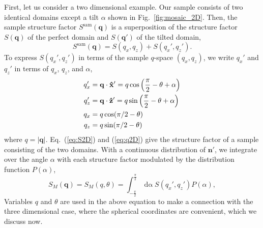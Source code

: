 First, let us consider a two dimensional example. 
Our sample consists of two identical domains except a tilt $\alpha$
shown in Fig.~\ref{fig:mosaic_2D}.
Then, the sample structure factor $S^\textrm{sam}(\mathbf{q})$ is 
a superposition of the structure factor $S(\mathbf{q})$ of the perfect
domain and $S(\mathbf{q'})$ of the tilted domain,
\begin{equation}
  S^\textrm{sam}(\mathbf{q}) = S(q_x,q_z) + S(q_x',q_z').
  \label{eq:S2D}
\end{equation}
To express $S(q_x',q_z')$ in terms of the sample $q$-space $(q_x,q_z)$, 
we write $q_x'$ and $q_z'$ in terms of $q_x$, $q_z$, and $\alpha$,
\begin{align}
  q_x' &= \mathbf{q}\cdot\mathbf{\hat{x}}' = q\cos\left(\frac{\pi}{2}-\theta+\alpha\right) \nonumber\\
  q_z' &= \mathbf{q}\cdot\mathbf{\hat{z}}' = q\sin\left(\frac{\pi}{2}-\theta+\alpha\right) \nonumber\\
  q_x &= q\cos(\pi/2-\theta) \nonumber\\
  q_z &= q\sin(\pi/2-\theta)
  \label{eq:q2D}
\end{align}
where $q=|\mathbf{q}|$. Eq.~(\ref{eq:S2D}) and (\ref{eq:q2D}) give
the structure factor of a sample consisting of the two domains. With a 
continuous distribution of $\mathbf{n'}$, we integrate over the angle $\alpha$
with each structure factor modulated by the distribution function $P(\alpha)$,
\begin{equation}
  S_M(\mathbf{q})=S_M(q,\theta)=\int_{-\frac{\pi}{2}}^{\frac{\pi}{2}}
  \mathop{d\alpha} S(q_x',q_z')P(\alpha),
  \label{eq:SM2D}
\end{equation}
Variables $q$ and $\theta$ are used in the above equation to make a connection with the
three dimensional case, where the spherical coordinates are convenient, which
we discuss now.

